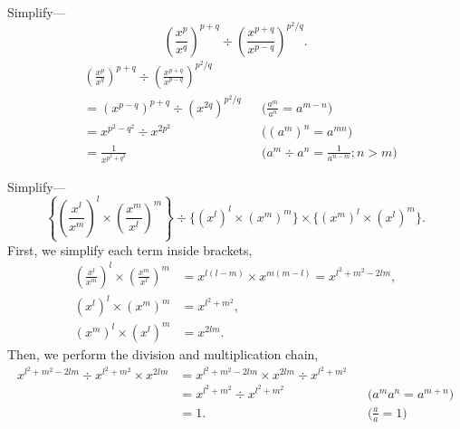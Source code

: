 \documentclass[DIN, pagenumber=false, fontsize=11pt, parskip=half]{scrartcl}
\begin{document}
\begin{problems}[from=1,step=1]
    \problem Simplify---
    \[
        \left(\frac{x^p}{x^q}\right)^{p+q} \div \left(\frac{x^{p+q}}{x^{p-q}}\right)^{p^2/q}.
    \]
    \answer 
    \begin{align*}
        &\left(\frac{x^p}{x^q}\right)^{p+q} \div \left(\frac{x^{p+q}}{x^{p-q}}\right)^{p^2/q} \\ 
        &= (x^{p-q})^{p+q} \div (x^{2q})^{p^2/q} && \text{($\tfrac{a^m}{a^n} = a^{m-n}$)}\\ 
        &= x^{p^2-q^2} \div x^{2p^2} && \text{($(a^m)^n = a^{mn}$)}\\ 
        &= \frac{1}{x^{p^2+q^2}} && \text{($a^m \div a^n = \tfrac{1}{a^{n-m}}; n>m$)}
    \end{align*}

    \problem Simplify---
    \[
        \left\{ \left(\frac{x^l}{x^m}\right)^{l} \times \left(\frac{x^m}{x^l}\right)^{m} \right\} \div \{(x^l)^l \times (x^m)^m\} \times \{(x^m)^l \times (x^l)^m\}.
    \]
    \answer 
    First, we simplify each term inside brackets,
    \begin{align*}
        \left(\frac{x^l}{x^m}\right)^{l} \times \left(\frac{x^m}{x^l}\right)^{m} &= x^{l(l-m)} \times x^{m(m-l)} = x^{l^2+m^2-2lm}, \\
        (x^l)^l \times (x^m)^m &= x^{l^2+m^2}, \\
        (x^m)^l \times (x^l)^m &= x^{2lm}.
    \end{align*}
    Then, we perform the division and multiplication chain,
    \begin{align*}
        x^{l^2+m^2-2lm} \div x^{l^2+m^2} \times x^{2lm} 
        &= x^{l^2+m^2-2lm} \times x^{2lm} \div x^{l^2+m^2} \\
        &= x^{l^2+m^2} \div x^{l^2+m^2} && \text{($a^ma^n = a^{m+n}$)}\\
        &= 1. && \text{($\tfrac{a}{a} = 1$)}
    \end{align*}


\end{problems}
\end{document}
